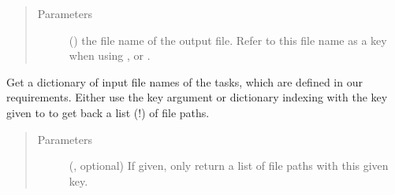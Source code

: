 \documentclass[letterpaper,10pt,english]{sphinxmanual}
\begin{document}
\begin{fulllineitems}
\begin{fulllineitems}
\begin{sphinxVerbatim}[commandchars=\\\{\}]
 
     
     
\end{sphinxVerbatim}
\begin{quote}\begin{description}
\item[{Parameters}] \leavevmode
{} () \textendash{} the file name of the output file.
Refer to this file name as a key when using {\hyperref[\detokenize{documentation/api:b2luigi.Task.get_input_file_names}]{}},
 or .

\end{description}\end{quote}

\end{fulllineitems}


\begin{fulllineitems}
\label{\detokenize{documentation/api:b2luigi.Task.get_input_file_names}}
Get a dictionary of input file names of the tasks, which are defined in our requirements.
Either use the key argument or dictionary indexing with the key given to {\hyperref[\detokenize{documentation/api:b2luigi.Task.add_to_output}]{}}
to get back a list (!) of file paths.
\begin{quote}\begin{description}
\item[{Parameters}] \leavevmode
{} (, optional) \textendash{} If given, only return a list of file paths with this given key.


\end{description}
\end{quote}
\end{fulllineitems}
\end{fulllineitems}
\end{document}
